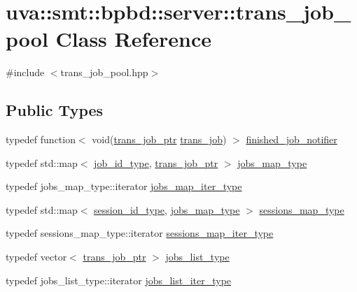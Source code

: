 \hypertarget{classuva_1_1smt_1_1bpbd_1_1server_1_1trans__job__pool}{}\section{uva\+:\+:smt\+:\+:bpbd\+:\+:server\+:\+:trans\+\_\+job\+\_\+pool Class Reference}
\label{classuva_1_1smt_1_1bpbd_1_1server_1_1trans__job__pool}


{\ttfamily \#include $<$trans\+\_\+job\+\_\+pool.\+hpp$>$}

\subsection*{Public Types}
\begin{DoxyCompactItemize}
\item 
typedef function$<$ void(\hyperlink{namespaceuva_1_1smt_1_1bpbd_1_1server_acb76132c82e66b5dbf7e3aa0e5af2580}{trans\+\_\+job\+\_\+ptr} \hyperlink{classuva_1_1smt_1_1bpbd_1_1server_1_1trans__job}{trans\+\_\+job}) $>$ \hyperlink{classuva_1_1smt_1_1bpbd_1_1server_1_1trans__job__pool_a6a18b765d5a321e2bcc7e3be3213c06e}{finished\+\_\+job\+\_\+notifier}
\item 
typedef std\+::map$<$ \hyperlink{namespaceuva_1_1smt_1_1bpbd_1_1common_1_1messaging_af12d41e7490214ac057969e9d4af1436}{job\+\_\+id\+\_\+type}, \hyperlink{namespaceuva_1_1smt_1_1bpbd_1_1server_acb76132c82e66b5dbf7e3aa0e5af2580}{trans\+\_\+job\+\_\+ptr} $>$ \hyperlink{classuva_1_1smt_1_1bpbd_1_1server_1_1trans__job__pool_a3fec3b5759e5296106b61143a5d229b2}{jobs\+\_\+map\+\_\+type}
\item 
typedef jobs\+\_\+map\+\_\+type\+::iterator \hyperlink{classuva_1_1smt_1_1bpbd_1_1server_1_1trans__job__pool_a8991aa93c2caf5fb2c6354bb3564f268}{jobs\+\_\+map\+\_\+iter\+\_\+type}
\item 
typedef std\+::map$<$ \hyperlink{namespaceuva_1_1smt_1_1bpbd_1_1common_1_1messaging_a17ad17f94b78abb87ab5f3f3d6f09588}{session\+\_\+id\+\_\+type}, \hyperlink{classuva_1_1smt_1_1bpbd_1_1server_1_1trans__job__pool_a3fec3b5759e5296106b61143a5d229b2}{jobs\+\_\+map\+\_\+type} $>$ \hyperlink{classuva_1_1smt_1_1bpbd_1_1server_1_1trans__job__pool_aa82f73de4939af58fc6e0c819c647469}{sessions\+\_\+map\+\_\+type}
\item 
typedef sessions\+\_\+map\+\_\+type\+::iterator \hyperlink{classuva_1_1smt_1_1bpbd_1_1server_1_1trans__job__pool_ac5e725580da6d0e9b4179f6be1c4770d}{sessions\+\_\+map\+\_\+iter\+\_\+type}
\item 
typedef vector$<$ \hyperlink{namespaceuva_1_1smt_1_1bpbd_1_1server_acb76132c82e66b5dbf7e3aa0e5af2580}{trans\+\_\+job\+\_\+ptr} $>$ \hyperlink{classuva_1_1smt_1_1bpbd_1_1server_1_1trans__job__pool_a7d67763b6e1818c785e515f2a61fe23d}{jobs\+\_\+list\+\_\+type}
\item 
typedef jobs\+\_\+list\+\_\+type\+::iterator \hyperlink{classuva_1_1smt_1_1bpbd_1_1server_1_1trans__job__pool_a425f33ff0864b19e0ba351c17036d823}{jobs\+\_\+list\+\_\+iter\+\_\+type}
\end{DoxyCompactItemize}
